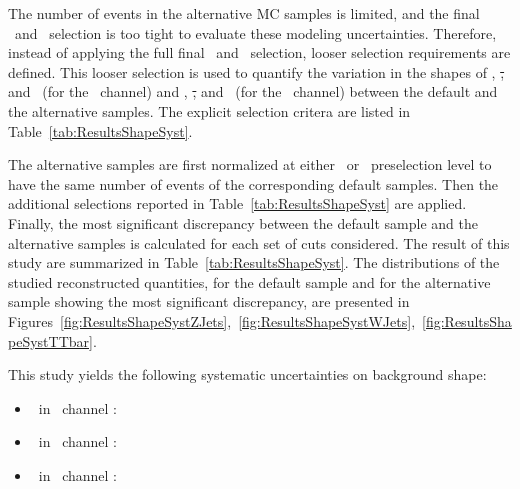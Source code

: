 The number of events in the alternative MC samples is limited, and
the final \eejj~and \enujj~selection is too tight to evaluate these modeling uncertainties.
Therefore, instead of applying the full final \eejj~and \enujj~selection,
looser selection requirements are defined.  This looser selection is used to 
quantify the variation in the shapes of \mee, \st, and \mej~(for the \eejj~channel) 
and \MET, \st, and \mej~(for the \enujj~channel) between the default and the alternative samples. 
The explicit selection critera are listed in Table~\ref{tab:ResultsShapeSyst}.

The alternative samples are first normalized at either \eejj~or \enujj~preselection level to 
have the same number of events of the corresponding default samples. 
Then the additional selections reported in Table~\ref{tab:ResultsShapeSyst} 
are applied. Finally, the most significant discrepancy between the default sample 
and the alternative samples is calculated for each set of cuts considered. 
The result of this study are summarized in Table~\ref{tab:ResultsShapeSyst}. 
The distributions of the studied reconstructed quantities, for 
the default sample and for the alternative sample 
showing the most significant discrepancy, are presented 
in Figures~\ref{fig:ResultsShapeSystZJets},~\ref{fig:ResultsShapeSystWJets},~\ref{fig:ResultsShapeSystTTbar}.

This study yields the following 
systematic uncertainties on background shape:
\begin{itemize}
\item \zjets~in \eejj~channel : \BkgShapeUncerZJetsEEJJ
\item \wjets~in \enujj~channel : \BkgShapeUncerWJetsENUJJ
\item \ttbar~in \enujj~channel : \BkgShapeUncerTtbarENUJJ
\end{itemize}

